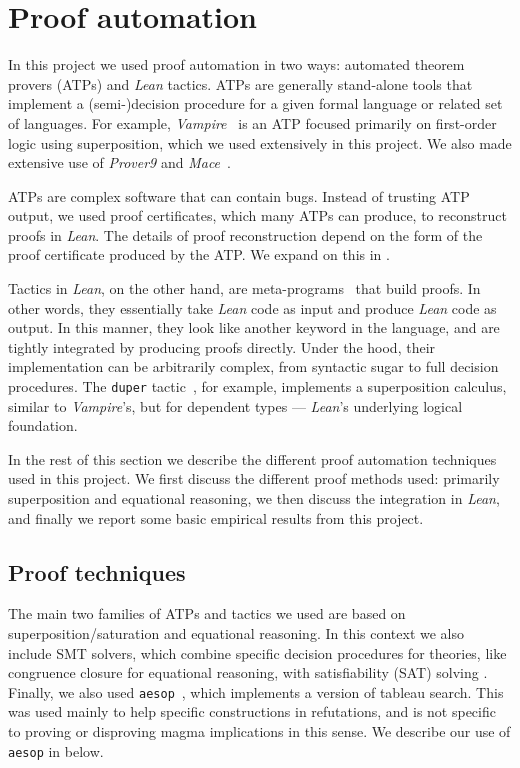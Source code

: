 \section{Proof automation}\label{automated-sec}

In this project we used proof automation in two ways: automated theorem provers (ATPs) and \emph{Lean} tactics.
ATPs are generally stand-alone tools that implement a (semi-)decision procedure for a given formal language or related set of languages.
For example, \emph{Vampire}~\cite{DBLP:conf/cav/KovacsV13} is an ATP focused primarily on first-order logic using superposition, which we used extensively in this project.  We also made extensive use of \emph{Prover9} and \emph{Mace}~\cite{prover9-mace4}.

ATPs are complex software that can contain bugs.
Instead of trusting ATP output, we used proof certificates, which many ATPs can produce, to reconstruct proofs in \emph{Lean}.
The details of proof reconstruction depend on the form of the proof certificate produced by the ATP.
We expand on this in .

Tactics in \emph{Lean}, on the other hand, are meta-programs~\cite{DBLP:journals/pacmpl/EbnerURAM17} that build proofs.
In other words, they essentially take \emph{Lean} code as input and produce \emph{Lean} code as output.
In this manner, they look like another keyword in the language, and are tightly integrated by producing proofs directly.
Under the hood, their implementation can be arbitrarily complex, from syntactic sugar to full decision procedures.
The \texttt{duper} tactic~\cite{DBLP:conf/itp/CluneQBA24}, for example, implements a superposition calculus, similar to \emph{Vampire}'s, but for dependent types --- \emph{Lean}'s underlying logical foundation.

In the rest of this section we describe the different proof automation techniques used in this project.
We first discuss the different proof methods used: primarily superposition and equational reasoning, we then discuss the integration in \emph{Lean}, and finally we report some basic empirical results from this project.

\subsection*{Proof techniques}

The main two families of ATPs and tactics we used are based on superposition/saturation and equational reasoning.
In this context we also include SMT solvers, which combine specific decision procedures for theories, like congruence closure for equational reasoning, with satisfiability (SAT) solving \cite{deMoura-Bjorner-2009}.
Finally, we also used \texttt{aesop}~\cite{DBLP:conf/cpp/LimpergF23}, which implements a version of tableau search.
This was used mainly to help specific constructions in refutations, and is not specific to proving or disproving magma implications in this sense.
We describe our use of \texttt{aesop} in  below.

